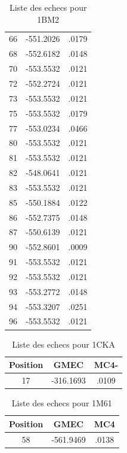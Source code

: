 \documentclass[a4paper,12pt]{article}
\begin{document}
\begin{table}[!htbp]
\begin{tabular}{|c|c|c|}
        66 & -551.2026 & .0179 \\
        68 & -552.6182 & .0148 \\
        70 & -553.5532 & .0121 \\
        72 & -552.2724 & .0121 \\
        73 & -553.5532 & .0121 \\
        75 & -553.5532 & .0179 \\
        77 & -553.0234 & .0466 \\
        80 & -553.5532 & .0121 \\
        81 & -553.5532 & .0121 \\
        82 & -548.0641 & .0121 \\
        83 & -553.5532 & .0121 \\
        85 & -550.1884 & .0122 \\
        86 & -552.7375 & .0148 \\
        87 & -550.6139 & .0121 \\
        90 & -552.8601 & .0009 \\
        91 & -553.5532 & .0121 \\
        92 & -553.5532 & .0121 \\
        93 & -553.2772 & .0148 \\
        94 & -553.3207 & .0251 \\
        96 & -553.5532 & .0121 \\
        \hline


      \end{tabular}      
      \caption{Liste des echecs pour 1BM2}
      \label{tab_best_ener_no_active}      
    \end{table}




    \begin{table}[!htbp]
      \centering

      \begin{tabular}{|c|c|c|}


        \hline
        Position & GMEC & MC4- \\
        \hline
        17 & -316.1693 & .0109 \\

\hline
      \end{tabular}      
      \caption{Liste des echecs pour 1CKA}
      \label{tab_echec_1CKA_1}      
    \end{table}

    \begin{table}[!htbp]
      \centering

      \begin{tabular}{|c|c|c|}

        \hline
        \hline
        Position & GMEC & MC4 \\
        \hline
        58 & -561.9469 & .0138 \\
        
        \hline

      \end{tabular}      
      \caption{Liste des echecs pour 1M61}
      \label{tab_echec1M61__1}      
    \end{table}
    
\end{document}
